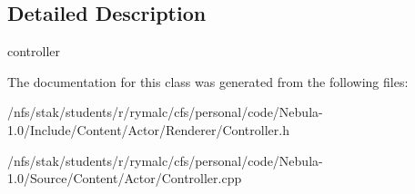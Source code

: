\subsection{Detailed Description}
controller 

The documentation for this class was generated from the following files:\begin{DoxyCompactItemize}
\item 
/nfs/stak/students/r/rymalc/cfs/personal/code/Nebula-\/1.0/Include/Content/Actor/Renderer/Controller.h\item 
/nfs/stak/students/r/rymalc/cfs/personal/code/Nebula-\/1.0/Source/Content/Actor/Controller.cpp\end{DoxyCompactItemize}
